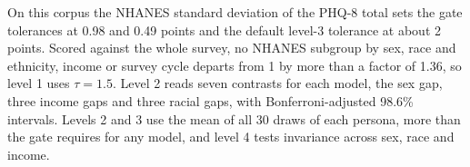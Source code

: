 On this corpus the NHANES standard deviation of the PHQ-8 total sets the gate tolerances at 0.98 and 0.49 points and the default level-3 tolerance at about 2 points. %
Scored against the whole survey, no NHANES subgroup by sex, race and ethnicity, income or survey cycle departs from 1 by more than a factor of 1.36, so level 1 uses $\tau = 1.5$. %
Level 2 reads seven contrasts for each model, the sex gap, three income gaps and three racial gaps, with Bonferroni-adjusted 98.6\% intervals.
Levels 2 and 3 use the mean of all 30 draws of each persona, more than the gate requires for any model, and level 4 tests invariance across sex, race and income.
